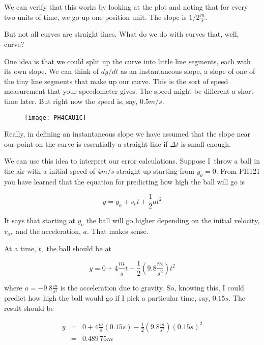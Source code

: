We can verify that this works by looking at the plot and noting that for every two units of time, we go up one position unit. The slope is $1/2\frac{\unit{m}}{\unit{s}}.$

But not all curves are straight lines. What do we do with curves that, well, curve?

One idea is that we could split up the curve into little line segments, each with its own slope. We can think of $dy/dt$ as an instantaneous slope, a slope of one of the tiny line segments that make up our curve. This is the sort of speed measurement that your speedometer gives. The speed might be different a short time later. But right now the speed is, say, $0.5\unit{m}/ \unit{s}.$

\begin{figure}[h!]
	\centering
    \texttt{[image: PH4CAU1C]}
\end{figure}

Really, in defining an instantaneous slope we have assumed that the slope near our point on the
curve is essentially a straight line if $\Delta t$ is small enough.

We can use this idea to interpret our error calculations. Suppose I\ throw a ball in the air with a initial speed of $4\unit{m}/\unit{s}$ straight up starting from $y_{o}=0$. From PH121 you have learned that the equation for predicting how high the ball will go is 

\begin{equation*}
	y=y_{o}+v_{o}t+\frac{1}{2}at^{2}
\end{equation*}

It says that starting at $y_{o}$ the ball will go higher depending on the initial velocity, $v_{o},$ and the acceleration, $a.$ That makes sense.

At a time, $t,$ the ball should be at 

\begin{equation*}
	y=0+4\frac{\unit{m}}{\unit{s}}t-\frac{1}{2}\left( 9.8\frac{\unit{m}}{\unit{s}^{2}}\right) t^{2}
\end{equation*}

where $a=-9.8\frac{\unit{m}}{\unit{s}^{2}}$ is the acceleration due to gravity. So, knowing this, I could predict how high the ball would go if I pick a particular time, say, $0.15\unit{s}.$ The result should be

\begin{eqnarray*}
	y &=&0+4\frac{\unit{m}}{\unit{s}}\left( 0.15\unit{s}\right) -\frac{1}{2} \left( 9.8\frac{\unit{m}}{\unit{s}^{2}}\right) \left( 0.15\unit{s}\right) ^{2} \\
      &=&0.489\,75\unit{m}
\end{eqnarray*}

